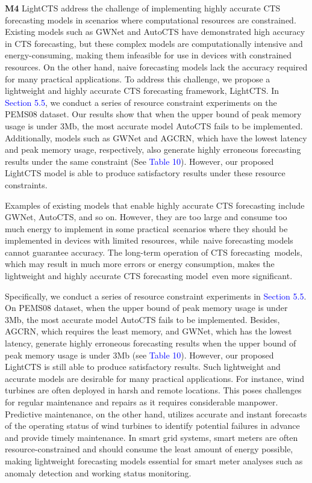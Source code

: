 \documentclass[sigconf,screen,anonymous=false]{acmart}
\newcommand{\where}[1]{{\textcolor{blue}{#1}}}
\begin{document}
\noindent
\textbf{M4}
\label{M4}
LightCTS address the challenge of implementing highly accurate CTS forecasting models in scenarios where computational resources are constrained. Existing models such as GWNet and AutoCTS have demonstrated high accuracy in CTS forecasting, but these complex models are computationally intensive and energy-consuming, making them infeasible for use in devices with constrained resources. On the other hand, naive forecasting models lack the accuracy required for many practical applications. To address this challenge, we propose a lightweight and highly accurate CTS forecasting framework, LightCTS. In 
\where{Section 5.5}, we conduct a series of resource constraint experiments on the PEMS08 dataset. Our results show that when the upper bound of peak memory usage is under 3Mb, the most accurate model AutoCTS fails to be implemented. Additionally, models such as GWNet and AGCRN, which have the lowest latency and peak memory usage, respectively, also generate highly erroneous forecasting results under the same constraint (See \where{Table 10}). However, our proposed LightCTS model is able to produce satisfactory results under these resource constraints.

Examples of existing models that enable highly accurate CTS forecasting include GWNet, AutoCTS, and so on. However, they are too large and consume too much energy to implement in some practical scenarios where they should be implemented in devices with limited resources, while naive forecasting models cannot guarantee accuracy. The long-term operation of CTS forecasting models, which may result in much more errors or energy consumption, makes the lightweight and highly accurate CTS forecasting model even more significant. 

Specifically, we conduct a series of resource constraint experiments in \where{Section 5.5}. On PEMS08 dataset, when the upper bound of peak memory usage is under 3Mb, the most accurate model AutoCTS fails to be implemented. Besides, AGCRN, which requires the least memory, and GWNet, which has the lowest latency, generate highly erroneous forecasting results when the upper bound of peak memory usage is under 3Mb (see \where{Table 10}). However, our proposed LightCTS is still able to produce satisfactory results. Such lightweight and accurate models are desirable for many practical applications. For instance, wind turbines are often deployed in harsh and remote locations. This poses challenges for regular maintenance and repairs as it requires considerable manpower. Predictive maintenance, on the other hand, utilizes accurate and instant forecasts of the operating status of wind turbines to identify potential failures in advance and provide timely maintenance. In smart grid systems, smart meters are often resource-constrained and should consume the least amount of energy possible, making lightweight forecasting models essential for smart meter analyses such as anomaly detection and working status monitoring.
\end{document}
